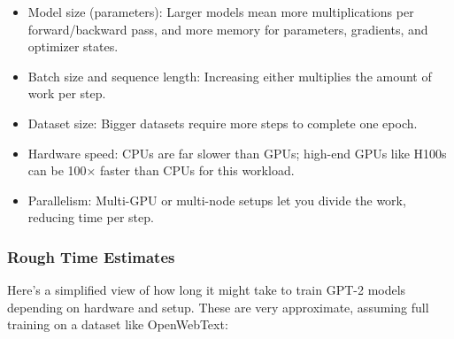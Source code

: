 \documentclass[
  letterpaper,
  DIV=11,
  numbers=noendperiod]{scrreprt}
\providecommand{\tightlist}{%
  \setlength{\itemsep}{0pt}\setlength{\parskip}{0pt}}
\begin{document}
\begin{itemize}
\tightlist
\item
  Model size (parameters): Larger models mean more multiplications per
  forward/backward pass, and more memory for parameters, gradients, and
  optimizer states.
\item
  Batch size and sequence length: Increasing either multiplies the
  amount of work per step.
\item
  Dataset size: Bigger datasets require more steps to complete one
  epoch.
\item
  Hardware speed: CPUs are far slower than GPUs; high-end GPUs like
  H100s can be 100× faster than CPUs for this workload.
\item
  Parallelism: Multi-GPU or multi-node setups let you divide the work,
  reducing time per step.
\end{itemize}

\subsubsection{Rough Time Estimates}\label{rough-time-estimates}

Here's a simplified view of how long it might take to train GPT-2 models
depending on hardware and setup. These are very approximate, assuming
full training on a dataset like OpenWebText:
\end{document}
